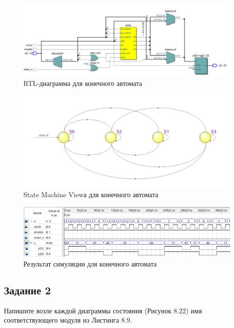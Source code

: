 \documentclass[a4paper,14pt]{article}
\begin{document}
	\begin{figure}[H]
		\centering
		\includegraphics[width=\linewidth]{images/extra_rtl}
		\caption{RTL-диаграмма для конечного автомата}
		\label{fig:extra_rtl}
	\end{figure}

	\begin{figure}[H]
		\centering
		\includegraphics[width=\linewidth]{images/extra_machine}
		\caption{State Machine Viewа для конечного автомата}
		\label{fig:extra_machine}
	\end{figure}

	\begin{figure}[H]
		\centering
		\includegraphics[width=\linewidth]{images/extra_sim}
		\caption{Результат симуляции для конечного автомата}
		\label{fig:extra_sim}
	\end{figure}

	\subsection{Задание 2}
	
	Напишите возле каждой диаграммы состояния (Рисунок 8.22) имя соответствующего модуля из Листинга 8.9.
	
\end{document}
